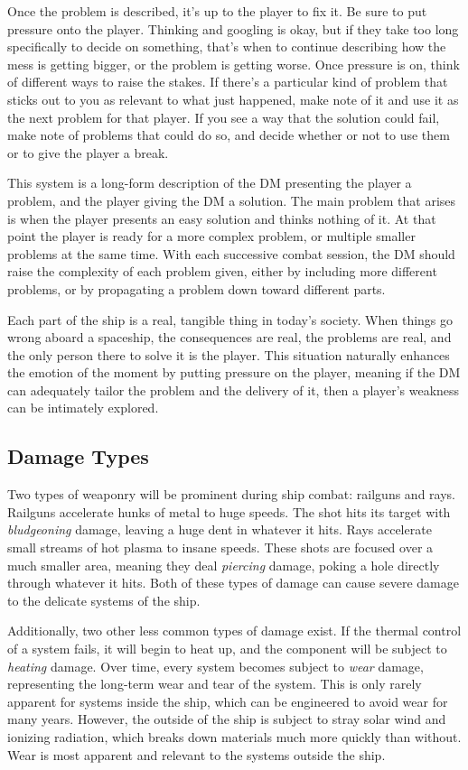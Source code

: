 \documentclass[a4paper]{article}
\begin{document}
Once the problem is described, it's up to the player to fix it. Be sure to put pressure onto the player. Thinking and googling is okay, but if they take too long specifically to decide on something, that's when to continue describing how the mess is getting bigger, or the problem is getting worse. Once pressure is on, think of different ways to raise the stakes. If there's a particular kind of problem that sticks out to you as relevant to what just happened, make note of it and use it as the next problem for that player. If you see a way that the solution could fail, make note of problems that could do so, and decide whether or not to use them or to give the player a break.

This system is a long-form description of the DM presenting the player a problem, and the player giving the DM a solution. The main problem that arises is when the player presents an easy solution and thinks nothing of it. At that point the player is ready for a more complex problem, or multiple smaller problems at the same time. With each successive combat session, the DM should raise the complexity of each problem given, either by including more different problems, or by propagating a problem down toward different parts.

Each part of the ship is a real, tangible thing in today's society. When things go wrong aboard a spaceship, the consequences are real, the problems are real, and the only person there to solve it is the player. This situation naturally enhances the emotion of the moment by putting pressure on the player, meaning if the DM can adequately tailor the problem and the delivery of it, then a player's weakness can be intimately explored.

\subsection{Damage Types} \label{damage_types}

Two types of weaponry will be prominent during ship combat: railguns and rays. Railguns accelerate hunks of metal to huge speeds. The shot hits its target with \textit{bludgeoning} damage, leaving a huge dent in whatever it hits. Rays accelerate small streams of hot plasma to insane speeds. These shots are focused over a much smaller area, meaning they deal \textit{piercing} damage, poking a hole directly through whatever it hits. Both of these types of damage can cause severe damage to the delicate systems of the ship.

Additionally, two other less common types of damage exist. If the thermal control of a system fails, it will begin to heat up, and the component will be subject to \textit{heating} damage. Over time, every system becomes subject to \textit{wear} damage, representing the long-term wear and tear of the system. This is only rarely apparent for systems inside the ship, which can be engineered to avoid wear for many years. However, the outside of the ship is subject to stray solar wind and ionizing radiation, which breaks down materials much more quickly than without. Wear is most apparent and relevant to the systems outside the ship.
\end{document}
